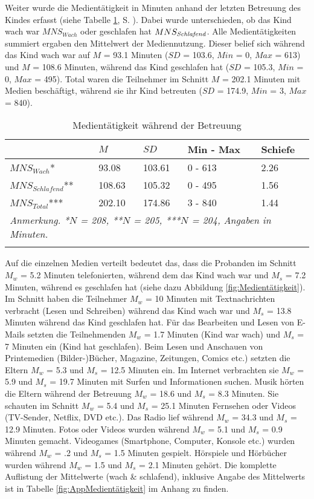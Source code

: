Weiter wurde die Medientätigkeit in Minuten anhand der letzten Betreuung des Kindes erfasst (siehe Tabelle \ref{table:Medientätigkeit}, S. \pageref{table:Medientätigkeit}). Dabei wurde unterschieden, ob das Kind wach war $MNS_{Wach}$ oder geschlafen hat $MNS_{\text{\textit{Schlafend}}}$. Alle Medientätigkeiten summiert ergaben den Mittelwert der Mediennutzung. Dieser belief sich während das Kind wach war auf $M$ = 93.1 Minuten ($SD$ = 103.6, $Min$ = 0, $Max$ = 613) und $M$ = 108.6 Minuten, während das Kind geschlafen hat ($SD$ = 105.3, $Min$ = 0, $Max$ = 495). Total waren die Teilnehmer im Schnitt $M$ = 202.1 Minuten mit Medien beschäftigt, während sie ihr Kind betreuten ($SD$ = 174.9, $Min$ = 3, $Max$ = 840).

\begin{table}[b]
\begin{tabular}{m{8em} m{4em}  m{4em}  m{5em} m{4em}} 
  \hline
  & $M$ & $SD$ & Min - Max & Schiefe\\
  \hline
  $MNS_{Wach}$* & 93.08 & 103.61 & 0 - 613 & 2.26\\
  $MNS_{Schlafend}$** & 108.63 & 105.32 & 0 - 495 & 1.56\\
  $MNS_{Total}$*** & 202.10 & 174.86 & 3 - 840 & 1.44 \\
  \hline
  \multicolumn{5}{l}{\textit{Anmerkung. *$N$ = 208, **$N$ = 205, ***$N$ = 204, Angaben in Minuten.}}\\
  &&&&\\
\end{tabular}
\caption{Medientätigkeit während der Betreuung}
\label{table:Medientätigkeit}
\end{table}

Auf die einzelnen Medien verteilt bedeutet das, dass die Probanden im Schnitt $M_{w}$ = 5.2 Minuten telefonierten, während dem das Kind wach war und $M_{s}$ = 7.2 Minuten, während es geschlafen hat (siehe dazu Abbildung \ref{fig:Medientätigkeit}). Im Schnitt haben die Teilnehmer $M_{w}$ = 10 Minuten mit Textnachrichten verbracht (Lesen und Schreiben) während das Kind wach war und $M_{s}$ = 13.8 Minuten während das Kind geschlafen hat. Für das Bearbeiten und Lesen von E-Mails setzten die Teilnehmenden $M_{w}$ = 1.7 Minuten (Kind war wach) und $M_{s}$ = 7 Minuten ein (Kind hat geschlafen). Beim Lesen und Anschauen von Printemedien (Bilder-)Bücher, Magazine, Zeitungen, Comics etc.) setzten die Eltern $M_{w}$ = 5.3 und $M_{s}$ = 12.5 Minuten ein. Im Internet verbrachten sie $M_{w}$ = 5.9 und $M_{s}$ = 19.7 Minuten mit Surfen und Informationen suchen. Musik hörten die Eltern während der Betreuung $M_{w}$ = 18.6 und $M_{s}$ = 8.3 Minuten. Sie schauten im Schnitt $M_{w}$ = 5.4 und $M_{s}$ = 25.1 Minuten Fernsehen oder Videos (TV-Sender, Netflix, DVD etc.). Das Radio lief während $M_{w}$ = 34.3 und $M_{s}$ = 12.9 Minuten. Fotos oder Videos wurden während $M_{w}$ = 5.1 und $M_{s}$ = 0.9 Minuten gemacht. Videogames (Smartphone, Computer, Konsole etc.) wurden während $M_{w}$ = .2 und $M_{s}$ = 1.5 Minuten gespielt. Hörspiele und Hörbücher wurden während $M_{w}$ = 1.5 und $M_{s}$ = 2.1 Minuten gehört. Die komplette Auflistung der Mittelwerte (wach \& schlafend), inklusive Angabe des  Mittelwerts ist in Tabelle \ref{fig:AppMedientätigkeit} im Anhang zu finden.

